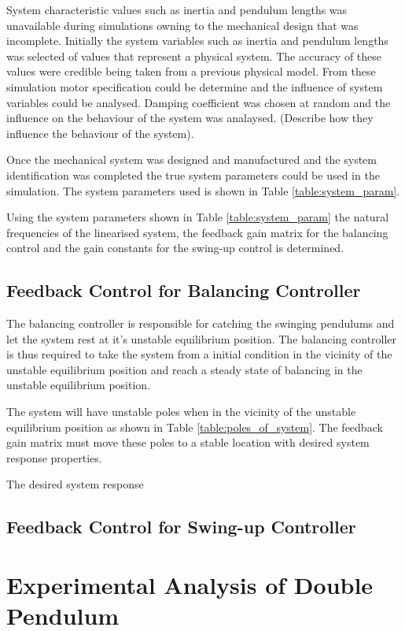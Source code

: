 \documentclass[a4paper,12pt]{article}
\begin{document}
	System characteristic values such as inertia and pendulum lengths was unavailable during simulations owning to the mechanical design that was incomplete. Initially the system variables such as inertia and pendulum lengths was selected of values that represent a physical system. The accuracy of these values were credible being taken from a previous physical model. From these simulation motor specification could be determine and the influence of system variables could be analysed. Damping coefficient was chosen at random and the influence on the behaviour of the system was analaysed. (Describe how they influence the behaviour of the system).
	
	Once the mechanical system was designed and manufactured and the system identification was completed the true system parameters could be used in the simulation. The system parameters used is shown in Table \ref{table:system_param}.
	
	Using the system parameters shown in Table \ref{table:system_param} the natural frequencies of the linearised system, the feedback gain matrix for the balancing control and the gain constants for the swing-up control is determined.
	
	\subsection{Feedback Control for Balancing Controller}
	
	The balancing controller is responsible for catching the swinging pendulums and let the system rest at it's unstable equilibrium position. The balancing controller is thus required to take the system from a initial condition in the vicinity of the unstable equilibrium position and reach a steady state of balancing in the unstable equilibrium position.
	
	The system will have unstable poles when in the vicinity of the unstable equilibrium position as shown in Table \ref{table:poles_of_system}. The feedback gain matrix must move these poles to a stable location with desired system response properties.
	
	The desired system response 
	
	
	
	
	\subsection{Feedback Control for Swing-up Controller}
	
	
	\section{Experimental Analysis of Double Pendulum}
	
\end{document}
